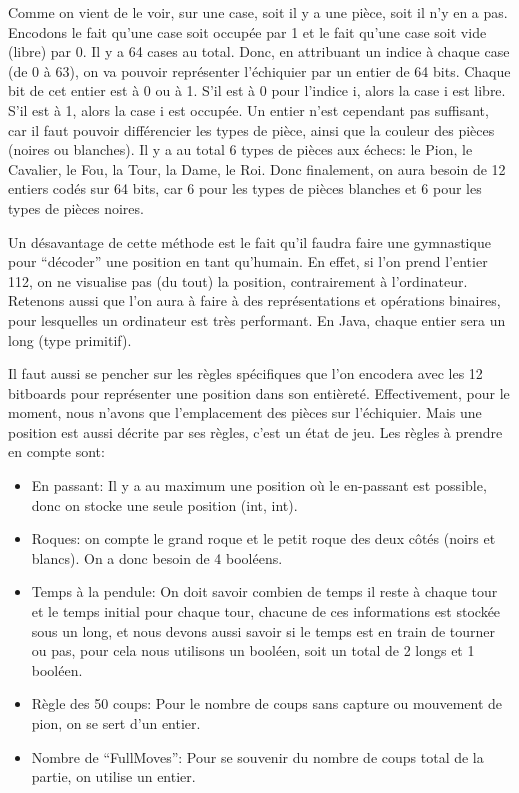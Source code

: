 \documentclass{article}
\begin{document}
Comme on vient de le voir, sur une case, soit il y a une pièce, soit il n'y en a pas.
Encodons le fait qu'une case soit occupée par 1 et le fait qu'une case soit vide (libre) par 0. Il y a 64 cases au total.
Donc, en attribuant un indice à chaque case (de 0 à 63), on va pouvoir représenter l'échiquier par un entier de 64 bits.
Chaque bit de cet entier est à 0 ou à 1. S'il est à 0 pour l'indice i, alors la case i est libre. S'il est à 1, alors la
case i est occupée. Un entier n'est cependant pas suffisant, car il faut pouvoir différencier les types de pièce, ainsi
que la couleur des pièces (noires ou blanches). Il y a au total 6 types de pièces aux échecs: le Pion, le Cavalier, le Fou,
la Tour, la Dame, le Roi. Donc finalement, on aura besoin de 12 entiers codés sur 64 bits, car 6 pour les types de pièces
blanches et 6 pour les types de pièces noires.

Un désavantage de cette méthode
est le fait qu'il faudra faire une gymnastique pour ``décoder'' une position en tant qu'humain. En effet, si l'on prend l'entier
112, on ne visualise pas (du tout) la position, contrairement à l'ordinateur.
Retenons aussi que l'on aura à faire à des représentations et opérations binaires, pour lesquelles un ordinateur est très
performant. En Java, chaque entier sera un long (type primitif).

Il faut aussi se pencher sur les règles spécifiques que l'on encodera avec les 12 bitboards pour représenter une position
dans son entièreté. Effectivement, pour le moment, nous n'avons que l'emplacement des pièces sur l'échiquier. Mais une position
est aussi décrite par ses règles, c'est un état de jeu. Les règles à prendre en compte sont:\\
\begin{itemize}
   \item En passant: Il y a au maximum une position où le en-passant est possible, donc on stocke une seule position (int, int).
    \item Roques: on compte le grand roque et le petit roque des deux côtés (noirs et blancs). On a donc besoin de 4 booléens.
   \item Temps à la pendule: On doit savoir combien de temps il reste à chaque tour et le temps initial pour chaque tour, chacune de ces informations est stockée sous un long, et nous devons aussi savoir si le temps est en train de tourner ou pas, pour cela nous utilisons un booléen, soit un total de 2 longs et 1 booléen.
   \item Règle des 50 coups: Pour le nombre de coups sans capture ou mouvement de pion, on se sert d’un entier.
   \item Nombre de ``FullMoves'': Pour se souvenir du nombre de coups total de la partie, on utilise un entier.\\
\end{itemize}
\end{document}
